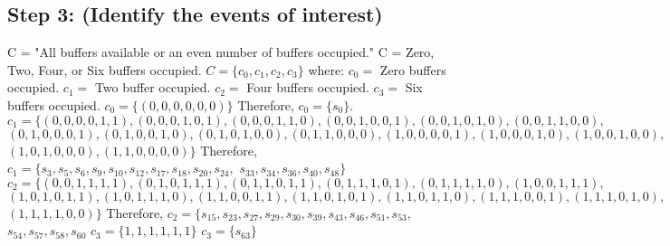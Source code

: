 \documentclass[a4paper,10pt]{article}
\begin{document}
\subsection{Step 3: (Identify the events of interest)}
C = "All buffers available or an even number of buffers occupied." \newline
C = Zero, Two, Four, or Six buffers occupied. \newline
$ C = \{c_{0}, c_{1}, c_{2}, c_{3}\} $ where: \newline
$ c_{0} = $ Zero buffers occupied. \newline
$ c_{1} = $ Two buffer occupied. \newline
$ c_{2} = $ Four buffers occupied. \newline
$ c_{3} = $ Six buffers occupied. \newline
$ c_{0} = \{(0,0,0,0,0,0)\} $ \newline
Therefore, $ c_{0} = \{s_{0}\} $. \newline
$ c_{1} = \{(0,0,0,0,1,1), (0,0,0,1,0,1), (0,0,0,1,1,0), (0,0,1,0,0,1), (0,0,1,0,1,0), (0,0,1,1,0,0), $ \newline
$ (0,1,0,0,0,1), (0,1,0,0,1,0), (0,1,0,1,0,0), (0,1,1,0,0,0), (1,0,0,0,0,1), (1,0,0,0,1,0), (1,0,0,1,0,0), $ \newline
$ (1,0,1,0,0,0), (1,1,0,0,0,0)\} $ \newline
Therefore, $ c_{1} = \{s_{3}, s_{5}, s_{6}, s_{9}, s_{10}, s_{12}, s_{17}, s_{18}, s_{20}, s_{24}, $ \newline
$ s_{33}, s_{34}, s_{36}, s_{40}, s_{48}\} $ \newline
$ c_{2} = \{(0,0,1,1,1,1), (0,1,0,1,1,1), (0,1,1,0,1,1), (0,1,1,1,0,1), (0,1,1,1,1,0), (1,0,0,1,1,1),$ \newline
$ (1,0,1,0,1,1), (1,0,1,1,1,0), (1,1,0,0,1,1), (1,1,0,1,0,1), (1,1,0,1,1,0), (1,1,1,0,0,1), (1,1,1,0,1,0), $ \newline
$ (1,1,1,1,0,0)\} $ \newline
Therefore, $ c_{2} = \{s_{15}, s_{23}, s_{27}, s_{29}, s_{30}, s_{39}, s_{43}, s_{46}, s_{51}, s_{53}, $ \newline
$ s_{54}, s_{57}, s_{58}, s_{60} $ \newline
$ c_{3} = \{1,1,1,1,1,1\} $ \newline
$ c_{3} = \{s_{63}\} $ \newline
\end{document}
